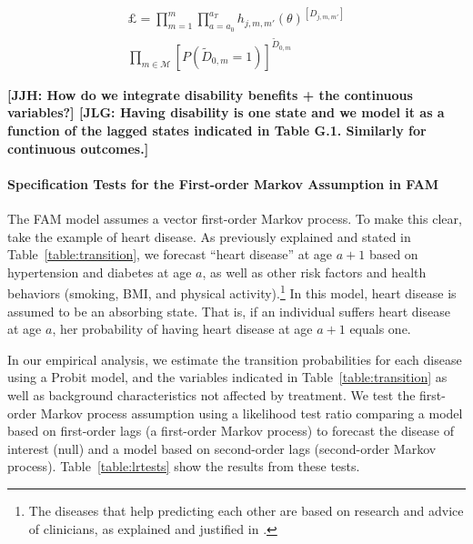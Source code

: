 \begin{align*}
\mathsterling = \prod^{m}_{m=1} \prod^{a_{T}}_{a=a_{0}} {h_{j,m,m'}(\theta)}^{[D_{j,m,m'}]} \\
\prod_{m \in \mathcal{M}}{[P (\tilde{D}_{0,m}=1)]}^{\tilde{D}_{0,m}}
\end{align*}

\textbf{[JJH: How do we integrate disability benefits + the continuous variables?] [JLG: Having disability is one state and we model it as a function of the lagged states indicated in Table G.1. Similarly for continuous outcomes.]} 

\paragraph{Specification Tests for the First-order Markov Assumption in FAM} \label{section:firstorder}

\noindent The FAM model assumes a vector first-order Markov process. To make this clear, take the example of heart disease. As previously explained and stated in Table~\ref{table:transition}, we forecast ``heart disease'' at age $a+1$ based on hypertension and diabetes at age $a$, as well as other risk factors and health behaviors (smoking, BMI, and physical activity).\footnote{The diseases that help predicting each other are based on research and advice of clinicians, as explained and justified in \citet{Goldman_etal_2015_Future-Elderly-Model-Report}.} In this model, heart disease is assumed to be an absorbing state. That is, if an individual suffers heart disease at age $a$, her probability of having heart disease at age $a+1$ equals one.

\noindent In our empirical analysis, we estimate the transition probabilities for each disease using a Probit model, and the variables indicated in Table~\ref{table:transition} as well as background characteristics not affected by treatment. We test the first-order Markov process assumption using a likelihood test ratio comparing a model based on first-order lags (a first-order Markov process) to forecast the disease of interest (null) and a model based on second-order lags (second-order Markov process). Table~\ref{table:lrtests} show the results from these tests.


